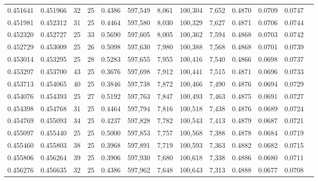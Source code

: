 \begin{tabular}{rrrrrrrrrrrrr}
0.451641 & 0.451966 &    32 &  25 &                                     0.4386 & 597,549 &   8,061 & 100,304 &   7,652 & 0.4870 & 0.0709 & 0.0747 \\
0.451981 & 0.452312 &    31 &  25 &                                     0.4464 & 597,580 &   8,030 & 100,329 &   7,627 & 0.4871 & 0.0706 & 0.0744 \\
0.452320 & 0.452727 &    25 &  33 &                                     0.5690 & 597,605 &   8,005 & 100,362 &   7,594 & 0.4868 & 0.0703 & 0.0742 \\
0.452729 & 0.453009 &    25 &  26 &                                     0.5098 & 597,630 &   7,980 & 100,388 &   7,568 & 0.4868 & 0.0701 & 0.0739 \\
0.453014 & 0.453295 &    25 &  28 &                                     0.5283 & 597,655 &   7,955 & 100,416 &   7,540 & 0.4866 & 0.0698 & 0.0737 \\
0.453297 & 0.453700 &    43 &  25 &                                     0.3676 & 597,698 &   7,912 & 100,441 &   7,515 & 0.4871 & 0.0696 & 0.0733 \\
0.453713 & 0.454065 &    40 &  25 &                                     0.3846 & 597,738 &   7,872 & 100,466 &   7,490 & 0.4876 & 0.0694 & 0.0729 \\
0.454076 & 0.454393 &    25 &  27 &                                     0.5192 & 597,763 &   7,847 & 100,493 &   7,463 & 0.4875 & 0.0691 & 0.0727 \\
0.454398 & 0.454768 &    31 &  25 &                                     0.4464 & 597,794 &   7,816 & 100,518 &   7,438 & 0.4876 & 0.0689 & 0.0724 \\
0.454769 & 0.455093 &    34 &  25 &                                     0.4237 & 597,828 &   7,782 & 100,543 &   7,413 & 0.4879 & 0.0687 & 0.0721 \\
0.455097 & 0.455440 &    25 &  25 &                                     0.5000 & 597,853 &   7,757 & 100,568 &   7,388 & 0.4878 & 0.0684 & 0.0719 \\
0.455460 & 0.455803 &    38 &  25 &                                     0.3968 & 597,891 &   7,719 & 100,593 &   7,363 & 0.4882 & 0.0682 & 0.0715 \\
0.455806 & 0.456264 &    39 &  25 &                                     0.3906 & 597,930 &   7,680 & 100,618 &   7,338 & 0.4886 & 0.0680 & 0.0711 \\
0.456276 & 0.456635 &    32 &  25 &                                     0.4386 & 597,962 &   7,648 & 100,643 &   7,313 & 0.4888 & 0.0677 & 0.0708 \\

\end{tabular}
